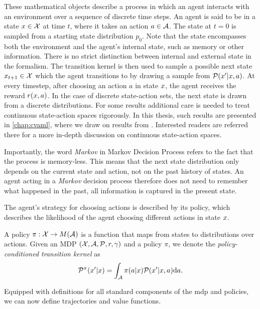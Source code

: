 These mathematical objects describe a process in which an agent interacts with an environment over a sequence of discrete time steps.
An agent is said to be in a state $x \in \mathcal{X}$ at time $t$, where it takes an action $a \in \mathcal{A}$.
The state at $t=0$ is sampled from a starting state distribution $p_0$.
Note that the state encompasses both the environment and the agent's internal state, such as memory or other information.
There is no strict distinction between internal and external state in the formalism.
The transition kernel is then used to sample a possible next state $x_{t+1} \in \mathcal{X}$ which the agent transitions to by drawing a sample from $\mathcal{P}(x'|x,a)$.
At every timestep, after choosing an action $a$ in state $x$, the agent receives the reward $r(x,a)$.
In the case of discrete state-action sets, the next state is drawn from a discrete distributions.
For some results additional care is needed to treat continuous state-action spaces rigorously.
In this thesis, such results are presented in \autoref{chap:cvaml}, where we draw on results from \textcite{bertsekasshreve1978}.
Interested readers are referred there for a more in-depth discussion on continuous state-action spaces.

Importantly, the word \emph{Markov} in Markov Decision Process refers to the fact that the process is memory-less.
This means that the next state distribution only depends on the current state and action, not on the past history of states.
An agent acting in a \emph{Markov} decision process therefore does not need to remember what happened in the past, all information is captured in the present state.

The agent's strategy for choosing actions is described by its policy, which describes the likelihood of the agent choosing different actions in state $x$.

\begin{definition}[Policy]
    A policy $\pi: \mathcal{X} \rightarrow M(\mathcal{A})$ is a function that maps from states to distributions over actions.
    Given an MDP $(\mathcal{X},\mathcal{A},\mathcal{P},r,\gamma)$ and a policy $\pi$, we denote the \emph{policy-conditioned transition kernel} as $$\mathcal{P}^\pi(x'|x) = \int_{\mathcal{A}} \pi(a|x) \mathcal{P}(x'|x, a) \mathrm{d} a.$$
\end{definition}

Equipped with definitions for all standard components of the \ac{mdp} and policies, we can now define trajectories and value functions.


